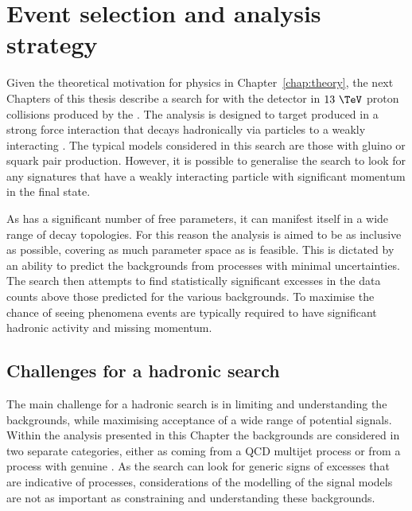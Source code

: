 \chapter{Event selection and analysis strategy} %
\label{chap:selection}

Given the theoretical motivation for \BSM physics in
Chapter~\ref{chap:theory}, the next Chapters of this thesis describe a
search for \SUSY with the \CMS detector in $13~\tev$ proton collisions
produced by the \LHC. The analysis is designed to target \SUSY
produced in a strong force interaction that decays hadronically via
\SM particles to a weakly interacting \LSP. The typical \SUSY models
considered in this search are those with gluino or squark pair
production. However, it is possible to generalise the search to look
for any \BSM signatures that have a weakly interacting particle with
significant momentum in the final state.

As \SUSY has a significant number of free parameters, it can manifest
itself in a wide range of decay topologies. For this reason the
analysis is aimed to be as inclusive as possible, covering as much
parameter space as is feasible.  This is dictated by an ability to
predict the backgrounds from \SM processes with minimal uncertainties.
The search then attempts to find statistically significant excesses in
the data counts above those predicted for the various backgrounds. To
maximise the chance of seeing \BSM phenomena events are typically
required to have significant hadronic activity and missing momentum.  


\section{Challenges for a hadronic \BSM search}
\label{sec:challenge}

The main challenge for a hadronic \BSM search is in limiting and
understanding the backgrounds, while maximising acceptance of a wide
range of potential \BSM signals. Within the analysis presented in this
Chapter the backgrounds are considered in two separate categories,
either as coming from a QCD multijet process or from a \SM process
with genuine \MET. As the search can look for generic signs of
excesses that are indicative of \BSM processes, considerations of the
modelling of the signal models are not as important as constraining
and understanding these backgrounds.

